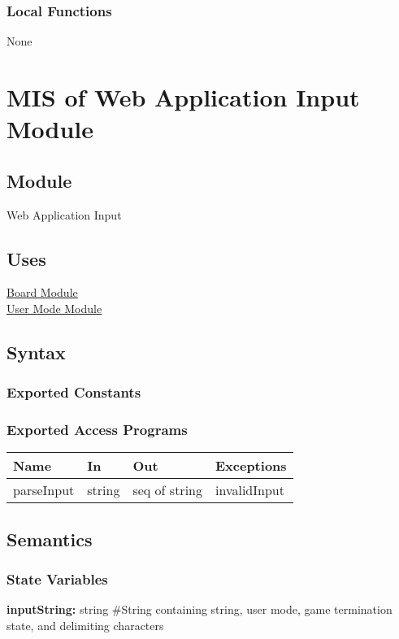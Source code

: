 \documentclass[12pt, titlepage]{article}
\begin{document}
\subsubsection{Local Functions}{
  None
}


\newpage

\section{MIS of Web Application Input Module} \label{mInput}

    \subsection{Module}
    Web Application Input

    \subsection{Uses}
    \hyperref[mBoard]{Board Module}\\
    \hyperref[mMode]{User Mode Module}

    \subsection{Syntax}
    \subsubsection{Exported Constants}
    
    \subsubsection{Exported Access Programs}
        \begin{center}
        \begin{tabular}{p{4.5cm} p{3cm} p{4cm} p{2.5cm}}
        \hline
        \textbf{Name} & \textbf{In} & \textbf{Out} & \textbf{Exceptions} \\
        \hline
        parseInput & string & seq of string & invalidInput \\
        \hline
        \end{tabular}
        \end{center}
    
    \subsection{Semantics}
    \subsubsection{State Variables}
    \textbf{inputString:} string \#String containing \cite{FEN} string, user mode, game 
    termination state, and delimiting characters
\end{document}
